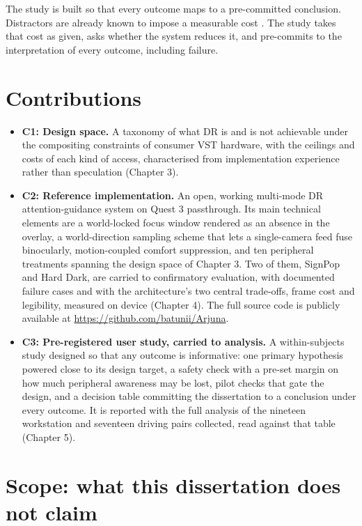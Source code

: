 The study is built so that every outcome maps to a pre-committed conclusion. Distractors are already known to impose
a measurable cost \citep[N = 66]{ai2025}. The study takes that cost as given, asks whether the
system reduces it, and pre-commits to the interpretation of every outcome, including failure.

\section{Contributions}

\begin{itemize}
\item \textbf{C1: Design space.} A taxonomy of what DR is and is not achievable under the
  compositing constraints of consumer VST hardware, with the ceilings and costs of each kind of
  access, characterised from implementation experience rather than speculation (Chapter 3).
\item \textbf{C2: Reference implementation.} An open, working multi-mode DR attention-guidance
  system on Quest 3 passthrough. Its main technical elements are a world-locked focus window
  rendered as an absence in the overlay, a world-direction sampling scheme that lets a
  single-camera feed fuse binocularly, motion-coupled comfort suppression, and ten peripheral treatments
  spanning the design space of Chapter 3. Two of them, SignPop and Hard Dark, are carried to
  confirmatory evaluation, with documented failure cases and with the architecture's two central
  trade-offs, frame cost and legibility, measured on device (Chapter 4). The full source code is
  publicly available at \url{https://github.com/batunii/Arjuna}.
\item \textbf{C3: Pre-registered user study, carried to analysis.} A within-subjects study designed
  so that any outcome is informative: one primary hypothesis powered close to its design target, a
safety check with
  a pre-set margin on how much peripheral awareness may be lost, pilot checks that gate the design,
  and a decision table committing the dissertation to a conclusion under every outcome. It is
  reported with the full analysis of the nineteen workstation and seventeen driving pairs collected,
  read against that table (Chapter 5).
\end{itemize}

\section{Scope: what this dissertation does not claim}

